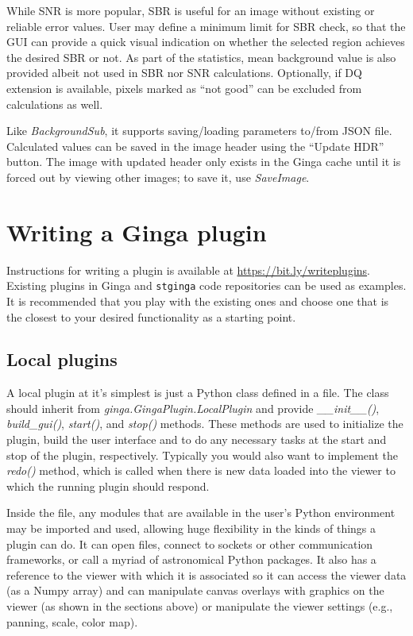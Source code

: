 \documentclass[11pt,twoside]{article}
\begin{document}
While SNR is more popular, SBR is useful for an image without existing or
reliable error values. User may define a minimum limit for SBR check,
so that the GUI can provide a quick visual indication on whether the
selected region achieves the desired SBR or not.
As part of the statistics, mean background value is also
provided albeit not used in SBR nor SNR calculations.
Optionally, if DQ extension is available, pixels marked as
``not good'' can be excluded from calculations as well.

Like {\em BackgroundSub}, it supports saving/loading parameters to/from
JSON file.
Calculated values can be saved in the image header using the ``Update HDR''
button.
The image with updated header only exists in the Ginga cache until it
is forced out by viewing other images; to save it, use {\em SaveImage}.

\section{Writing a Ginga plugin}

Instructions for writing a plugin is available at
\url{https://bit.ly/writeplugins}.
Existing plugins in Ginga and {\tt stginga} code repositories can be used as
examples. It is recommended that you play with the existing ones and
choose one that is the closest to your desired functionality as a
starting point.

\subsection{Local plugins}

A local plugin at it's simplest is just a Python class defined in a file.
The class should inherit from {\em ginga.GingaPlugin.LocalPlugin}
and provide {\em \_\_init\_\_()}, {\em build\_gui()},
{\em start()}, and {\em stop()} methods.
These methods are used to initialize the
plugin, build the user interface and to do any necessary tasks at the
start and stop of the plugin, respectively. Typically you would also
want to implement the {\em redo()} method, which is called when there is
new data loaded into the viewer to which the running plugin should respond.

Inside the file, any modules that are available in the user's Python
environment may be imported and used, allowing huge flexibility in
the kinds of things a plugin can do.  It can open files, connect to
sockets or other communication frameworks, or call a myriad of
astronomical Python packages.  It also has a reference to the viewer with
which it is associated so it can access the viewer data (as a Numpy array)
and can manipulate canvas overlays with graphics on the viewer (as shown
in the sections above) or manipulate the viewer settings (e.g., panning,
scale, color map).
\end{document}
